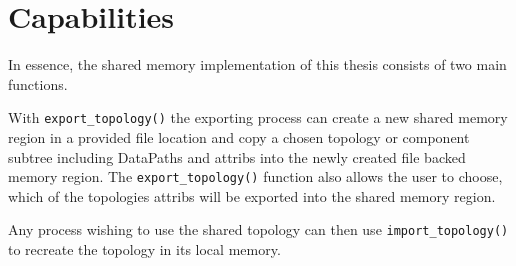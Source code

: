 \section{Capabilities}
In essence, the shared memory implementation of this thesis consists of two main functions.

With \lstinline|export_topology()| the exporting process can create a new shared memory region in a provided file location and
copy a chosen topology or component subtree including DataPaths and attribs into the newly created file backed memory region.
The \lstinline|export_topology()| function also allows the user to choose, which of the topologies attribs will be exported into the shared memory region.

Any process wishing to use the shared topology can then use \lstinline|import_topology()| to recreate the topology in its local memory.
